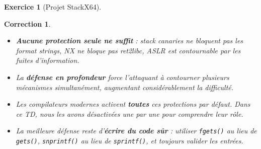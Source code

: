 \documentclass[a4paper,11pt]{article}
\theoremstyle{plain}
\newtheorem{correction}{Correction}
\theoremstyle{definition}
\newtheorem{exercice}{Exercice}
\begin{document}
\begin{exercice}[Projet StackX64]
\begin{correction}
\begin{pointcle}
\begin{itemize}
    \item \textbf{Aucune protection seule ne suffit} : stack canaries ne bloquent pas les format strings, NX ne bloque pas ret2libc, ASLR est contournable par les fuites d'information.
    \item La \textbf{défense en profondeur} force l'attaquant à contourner plusieurs mécanismes simultanément, augmentant considérablement la difficulté.
    \item Les compilateurs modernes activent \textbf{toutes} ces protections par défaut. Dans ce TD, nous les avons désactivées une par une pour comprendre leur rôle.
    \item La meilleure défense reste d'\textbf{écrire du code sûr} : utiliser \texttt{fgets()} au lieu de \texttt{gets()}, \texttt{snprintf()} au lieu de \texttt{sprintf()}, et toujours valider les entrées.
\end{itemize}
\end{pointcle}

\end{correction}

\end{exercice}
\end{document}
